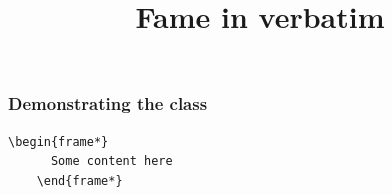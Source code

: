 \documentclass{ltx-talk}
\title{Fame in verbatim}
\begin{document}
\begin{Frame}
  \frametitle{Demonstrating the class}
  \begin{Verbatim}[gobble = 4]
    \begin{frame*}
      Some content here
    \end{frame*}
  \end{Verbatim}
\end{Frame}
\end{document}
